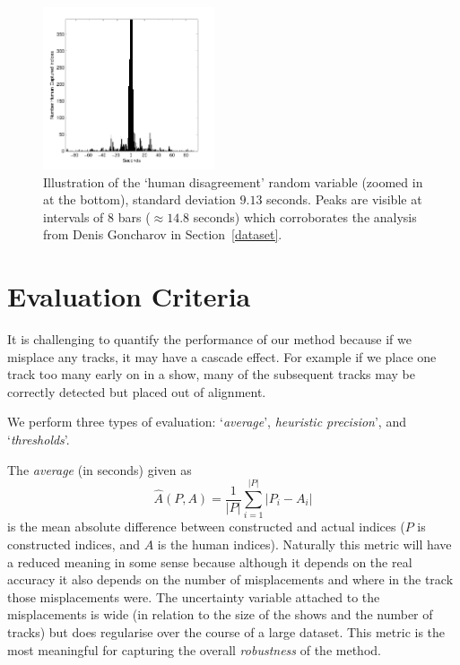 \documentclass[twocolumn]{article}
\begin{document}
	\begin{figure}
		\centering
		\includegraphics[width=0.45\textwidth]{images/human_confusion}
		
		\caption{Illustration of the `human disagreement' random variable (zoomed in at the bottom), standard deviation $9.13$ seconds. Peaks are visible at intervals of $8$ bars ($\approx 14.8$ seconds) which corroborates the analysis from Denis Goncharov in Section~\ref{dataset}. }
		\label{fig:human_muchconfuse}
	\end{figure} 
	
	   
	
	\section{Evaluation Criteria}\label{eval_crit}
	
	It is challenging to quantify the performance of our method because if we misplace any tracks, it may have a cascade effect. For example if we place one track too many early on in a show, many of the subsequent tracks may be correctly detected but placed out of alignment. 
	
	We perform three types of evaluation: `\textit{average}', \textit{heuristic precision}', and `\textit{thresholds}'.
	
	The \textit{average} (in seconds) given as $$\hat A(P,A) = \frac{1}{|P|}\sum_{i=1}^{|P|}{|P_i-A_i|}$$ is the mean absolute difference between constructed and actual indices ($P$ is constructed indices, and $A$ is the human indices). Naturally this metric will have a reduced meaning in some sense because although it depends on the real accuracy it also depends on the number of misplacements and where in the track those misplacements were. The uncertainty variable attached to the misplacements is wide (in relation to the size of the shows and the number of tracks) but does regularise over the course of a large dataset. This metric is the most meaningful for capturing the overall \textit{robustness} of the method.
	
\end{document}
